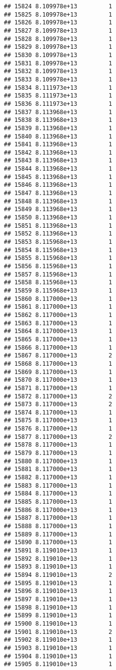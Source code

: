 \documentclass[
]{article}
\begin{document}
\begin{verbatim}
## 15824 8.109978e+13         1
## 15825 8.109978e+13         1
## 15826 8.109978e+13         1
## 15827 8.109978e+13         1
## 15828 8.109978e+13         1
## 15829 8.109978e+13         1
## 15830 8.109978e+13         1
## 15831 8.109978e+13         1
## 15832 8.109978e+13         1
## 15833 8.109978e+13         1
## 15834 8.111973e+13         1
## 15835 8.111973e+13         1
## 15836 8.111973e+13         1
## 15837 8.113968e+13         1
## 15838 8.113968e+13         1
## 15839 8.113968e+13         1
## 15840 8.113968e+13         1
## 15841 8.113968e+13         1
## 15842 8.113968e+13         1
## 15843 8.113968e+13         1
## 15844 8.113968e+13         1
## 15845 8.113968e+13         1
## 15846 8.113968e+13         1
## 15847 8.113968e+13         1
## 15848 8.113968e+13         1
## 15849 8.113968e+13         1
## 15850 8.113968e+13         1
## 15851 8.113968e+13         1
## 15852 8.113968e+13         1
## 15853 8.115968e+13         1
## 15854 8.115968e+13         1
## 15855 8.115968e+13         1
## 15856 8.115968e+13         1
## 15857 8.115968e+13         1
## 15858 8.115968e+13         1
## 15859 8.115968e+13         1
## 15860 8.117000e+13         1
## 15861 8.117000e+13         1
## 15862 8.117000e+13         1
## 15863 8.117000e+13         1
## 15864 8.117000e+13         1
## 15865 8.117000e+13         1
## 15866 8.117000e+13         1
## 15867 8.117000e+13         2
## 15868 8.117000e+13         1
## 15869 8.117000e+13         1
## 15870 8.117000e+13         1
## 15871 8.117000e+13         1
## 15872 8.117000e+13         2
## 15873 8.117000e+13         2
## 15874 8.117000e+13         1
## 15875 8.117000e+13         1
## 15876 8.117000e+13         1
## 15877 8.117000e+13         2
## 15878 8.117000e+13         1
## 15879 8.117000e+13         1
## 15880 8.117000e+13         1
## 15881 8.117000e+13         1
## 15882 8.117000e+13         1
## 15883 8.117000e+13         1
## 15884 8.117000e+13         1
## 15885 8.117000e+13         1
## 15886 8.117000e+13         1
## 15887 8.117000e+13         1
## 15888 8.117000e+13         1
## 15889 8.117000e+13         1
## 15890 8.117000e+13         1
## 15891 8.119010e+13         1
## 15892 8.119010e+13         1
## 15893 8.119010e+13         1
## 15894 8.119010e+13         2
## 15895 8.119010e+13         1
## 15896 8.119010e+13         1
## 15897 8.119010e+13         1
## 15898 8.119010e+13         1
## 15899 8.119010e+13         1
## 15900 8.119010e+13         1
## 15901 8.119010e+13         2
## 15902 8.119010e+13         1
## 15903 8.119010e+13         1
## 15904 8.119010e+13         1
## 15905 8.119010e+13         1

\end{verbatim}
\end{document}
